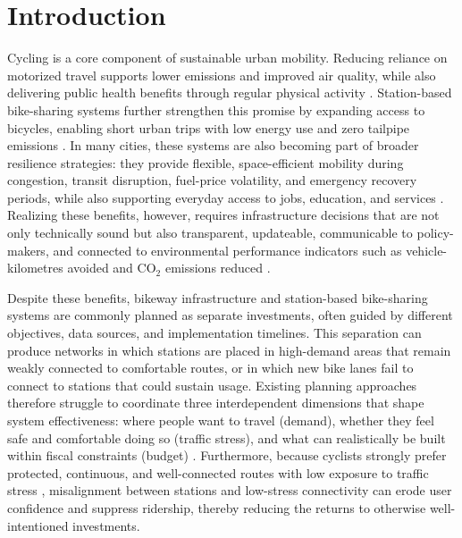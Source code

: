 \documentclass[preprint,authoryear,10pt]{elsarticle}
\begin{document}
\doublespacing


\section{Introduction}\label{intro}

Cycling is a core component of sustainable urban mobility. Reducing reliance on motorized travel supports lower emissions and improved air quality, while also delivering public health benefits through regular physical activity \citep{CHEN2022103475, BRAND2021102764}. Station-based bike-sharing systems further strengthen this promise by expanding access to bicycles, enabling short urban trips with low energy use and zero tailpipe emissions \citep{Pucher02112017, MCQUEEN2020102482, JACOBSON200914}. In many cities, these systems are also becoming part of broader resilience strategies: they provide flexible, space-efficient mobility during congestion, transit disruption, fuel-price volatility, and emergency recovery periods, while also supporting everyday access to jobs, education, and services \citep{chengBikeSharingResilience2022}. Realizing these benefits, however, requires infrastructure decisions that are not only technically sound but also transparent, updateable, communicable to policy-makers, and connected to environmental performance indicators such as vehicle-kilometres avoided and CO$_2$ emissions reduced \citep{BRAND2021102764, CHEN2022103475}.

Despite these benefits, bikeway infrastructure and station-based bike-sharing systems are commonly planned as separate investments, often guided by different objectives, data sources, and implementation timelines. This separation can produce networks in which stations are placed in high-demand areas that remain weakly connected to comfortable routes, or in which new bike lanes fail to connect to stations that could sustain usage. Existing planning approaches therefore struggle to coordinate three interdependent dimensions that shape system effectiveness: where people want to travel (demand), whether they feel safe and comfortable doing so (traffic stress), and what can realistically be built within fiscal constraints (budget) \citep{wiedemann2025Bikenetworkplanning, paulsen2023Societallyoptimalexpansion, nateraorozco2020Datadrivenstrategiesoptimal}. Furthermore, because cyclists strongly prefer protected, continuous, and well-connected routes with low exposure to traffic stress \citep{buehler2016BikewayNetworksReview, ta2021impactgreenspace, GRAYSTONE2022103237}, misalignment between stations and low-stress connectivity can erode user confidence and suppress ridership, thereby reducing the returns to otherwise well-intentioned investments.
\end{document}
